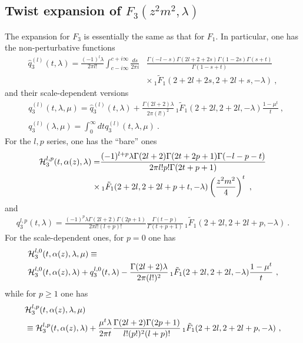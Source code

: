 \documentclass[a4paper,11pt]{article}
\begin{document}
\subsection{Twist expansion of $F_3(z^2m^2,\lambda)$}
The expansion for $F_3$ is essentially the same as that for $F_1$. In particular, one has the non-perturbative functions
\begin{align}\label{eq:q3l}
\hat q_3^{(l)}(t,\lambda)=\frac{(-1)^l\lambda}{2\pi l!}\int_{c-i\infty}^{c+i\infty}\frac{ds}{2\pi i}&\frac{\Gamma(-l-s)\Gamma(2l+2+2s)\Gamma(1-2s)\Gamma(s+t)}{\Gamma(1-s+t)}\nonumber \\ & \times \,_1\tilde F_1(2+2l+2s,2+2l+s,-\lambda) \ ,
\end{align}
and their scale-dependent versions
\begin{align}
&q_3^{(l)}(t,\lambda,\mu)=\hat q_3^{(l)}(t,\lambda)+\frac{\Gamma(2l+2)\lambda}{2\pi (l!)^2}\,_1\tilde F_1(2+2l,2+2l,-\lambda)\frac{1-\mu^t}{t} \ , \\
&q_3^{(l)}(\lambda,\mu)=\int_{0}^{\infty} dt q_3^{(l)}(t,\lambda,\mu) \ . \label{eq:q3lmu}
\end{align}
For the $l,p$ series, one has the ``bare'' ones
\begin{align}\label{eq:H3lp}
{\cal H}_3^{l,p}(t,\alpha(z),\lambda)= &\frac{(-1)^{l+p}\lambda \Gamma (2 l+2) \Gamma (2t+2p+1) \Gamma (-l-p-t)}{2 \pi  l! p!  \Gamma (2 t+p+1)} \nonumber \\ \times & \,_1\tilde F_1(2+2l,2+2l+p+t,-\lambda)\left(\frac{z^2m^2}{4}\right)^t \ , 
\end{align}
and 
\begin{align}\label{eq:q3lp}
q_3^{l,p}(t,\lambda)=\frac{(-1)^{p} \lambda \Gamma (2 l+2) \Gamma (2 p+1) }{2\pi  l! (l+p)! }\frac{\Gamma(t-p)}{\Gamma(t+p+1)}\,_1\tilde F_1(2+2l,2+2l+p,-\lambda) \ .
\end{align}
For the scale-dependent ones, for $p=0$ one has
\begin{align}
&{\cal H}_3^{l,0}(t,\alpha(z),\lambda,\mu)\equiv \nonumber \\ 
&{\cal H}_3^{l,0}(t,\alpha(z),\lambda)+q_3^{l,0}(t,\lambda)-\frac{\Gamma(2l+2)\lambda}{2\pi (l!)^2}\,_1\tilde F_1(2+2l,2+2l,-\lambda)\frac{1-\mu^t}{t} \ , 
\end{align}
while for $p\ge 1$ one has
\begin{align}\label{eq:H3lpmu}
&{\cal H}_3^{l,p}(t,\alpha(z),\lambda,\mu)\nonumber \\ 
&\equiv {\cal H}_3^{l,p}(t,\alpha(z),\lambda)+\frac{\mu^t \lambda}{2\pi t}\frac{\Gamma(2l+2)\Gamma(2p+1)}{l! (p!)^2(l+p)!}\,_1\tilde F_1(2+2l,2+2l+p,-\lambda) \ , 
\end{align}
\end{document}

